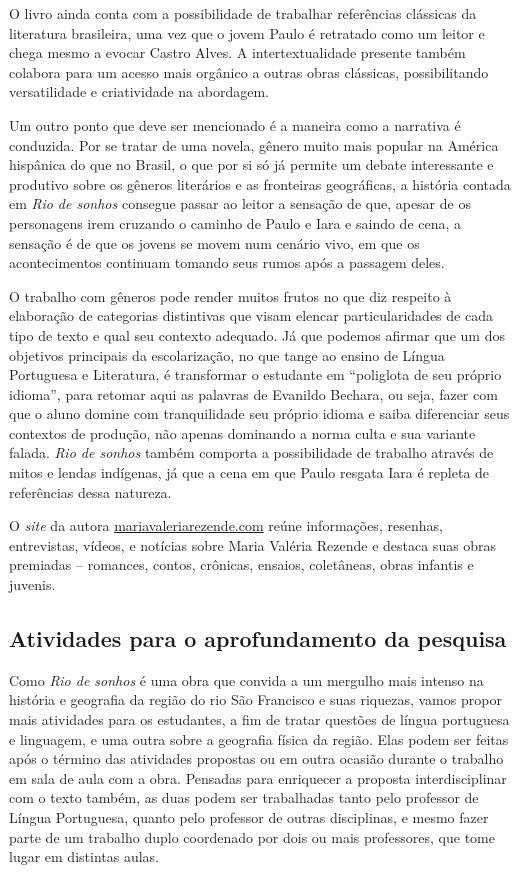 \documentclass[12pt]{extarticle}
\begin{document}
  O livro ainda conta com a possibilidade de trabalhar referências
  clássicas da literatura brasileira, uma vez que o jovem Paulo é
  retratado como um leitor e chega mesmo a evocar Castro Alves. A
  intertextualidade presente também colabora para um acesso mais
  orgânico a outras obras clássicas, possibilitando versatilidade e
  criatividade na abordagem.

  Um outro ponto que deve ser mencionado é a maneira como a narrativa é
  conduzida. Por se tratar de uma novela, gênero muito mais popular na
  América hispânica do que no Brasil, o que por si só já permite um
  debate interessante e produtivo sobre os gêneros literários e as
  fronteiras geográficas, a história contada em \emph{Rio de sonhos}
  consegue passar ao leitor a sensação de que, apesar de os personagens
  irem cruzando o caminho de Paulo e Iara e saindo de cena, a sensação é
  de que os jovens se movem num cenário vivo, em que os acontecimentos
  continuam tomando seus rumos após a passagem deles.

  O trabalho com gêneros pode render muitos frutos no que diz respeito à
  elaboração de categorias distintivas que visam elencar
  particularidades de cada tipo de texto e qual seu contexto adequado.
  Já que podemos afirmar que um dos objetivos principais da
  escolarização, no que tange ao ensino de Língua Portuguesa e
  Literatura, é transformar o estudante em ``poliglota de seu próprio
  idioma'', para retomar aqui as palavras de Evanildo Bechara, ou seja,
  fazer com que o aluno domine com tranquilidade seu próprio idioma e
  saiba diferenciar seus contextos de produção, não apenas dominando a
  norma culta e sua variante falada. \emph{Rio de sonhos} também
  comporta a possibilidade de trabalho através de mitos e lendas
  indígenas, já que a cena em que Paulo resgata Iara é repleta de
  referências dessa natureza.

  O \emph{site} da autora
  \href{https://www.mariavaleriarezende.com/}{mariavaleriarezende.com}
  reúne informações, resenhas, entrevistas, vídeos, e notícias sobre
  Maria Valéria Rezende e destaca suas obras premiadas -- romances,
  contos, crônicas, ensaios, coletâneas, obras infantis e juvenis.

\subsection{Atividades para o aprofundamento da pesquisa}

  Como \emph{Rio de sonhos} é uma obra que convida a um mergulho mais
  intenso na história e geografia da região do rio São Francisco e suas
  riquezas, vamos propor mais atividades para os
  estudantes, a fim de tratar questões de língua portuguesa e linguagem, e
  uma outra sobre a geografia física da região. Elas podem ser feitas
  após o término das atividades propostas ou em outra ocasião durante o
  trabalho em sala de aula com a obra. Pensadas para enriquecer a
  proposta interdisciplinar com o texto também, as duas podem ser
  trabalhadas tanto pelo professor de Língua Portuguesa, quanto pelo
  professor de outras disciplinas, e mesmo fazer parte de um trabalho
  duplo coordenado por dois ou mais professores, que tome lugar em
  distintas aulas.
\end{document}
